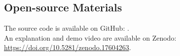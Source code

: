 \subsection*{Open-source Materials}
The source code is available on GitHub: . \\
An explanation and demo video are available on Zenodo: \href{https://doi.org/10.5281/zenodo.17604263}{https://doi.org/10.5281/zenodo.17604263}.









